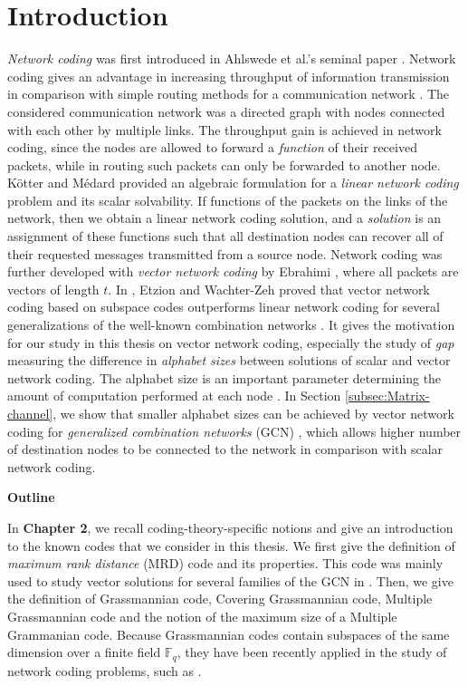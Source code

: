 \chapter{Introduction} \label{chap:introduction}

\textit{Network coding} was first introduced in Ahlswede et al.'s
seminal paper \cite{Ahlswede:2000}. Network coding gives an advantage
in increasing throughput of information transmission in comparison
with simple routing methods for a communication network \cite{Li:2003,Ho:2003}.
The considered communication network was a directed graph with nodes
connected with each other by multiple links. The throughput gain is
achieved in network coding, since the nodes are allowed to forward
a \textit{function} of their received packets, while in routing such
packets can only be forwarded to another node. K\"otter and M\'edard
provided an algebraic formulation for a \textit{linear network coding}
problem and its scalar solvability. If functions of the packets on
the links of the network, then we obtain a linear network coding solution,
and a \textit{solution} is an assignment of these functions such that
all destination nodes can recover all of their requested messages
transmitted from a source node. Network coding was further developed
with \textit{vector network coding} by Ebrahimi \cite{Ebrahimi:2011},
where all packets are vectors of length $t$. In \cite{Wachter-Zeh:2018},
Etzion and Wachter-Zeh proved that vector network coding based on
subspace codes outperforms linear network coding for several generalizations
of the well-known combination networks \cite{Riis:2006}. It gives
the motivation for our study in this thesis on vector network coding,
especially the study of \textit{gap} measuring the difference in \textit{alphabet
sizes} between solutions of scalar and vector network coding. The
alphabet size is an important parameter determining the amount of
computation performed at each node \cite{Wachter-Zeh:2018}. In Section
\ref{subsec:Matrix-channel}, we show that smaller alphabet sizes
can be achieved by vector network coding for \textit{generalized combination
networks} (GCN) \cite{Wachter-Zeh:2018}, which allows higher number
of destination nodes to be connected to the network in comparison
with scalar network coding.

\textbf{Outline}

In \textbf{Chapter 2}, we recall coding-theory-specific notions and
give an introduction to the known codes that we consider in this thesis.
We first give the definition of \textit{maximum rank distance} (MRD)
code and its properties. This code was mainly used to study vector
solutions for several families of the GCN in \cite{Wachter-Zeh:2018}.
Then, we give the definition of Grassmannian code, Covering Grassmannian
code, Multiple Grassmannian code and the notion of the maximum size
of a Multiple Grammanian code. Because Grassmannian codes contain
subspaces of the same dimension over a finite field $\ensuremath{\mathbb{F}}_{q}$,
they have been recently applied in the study of network coding problems,
such as \cite{Etzion:2016,Etzion:2018,Wachter-Zeh:2018,Zhang:2019}.


